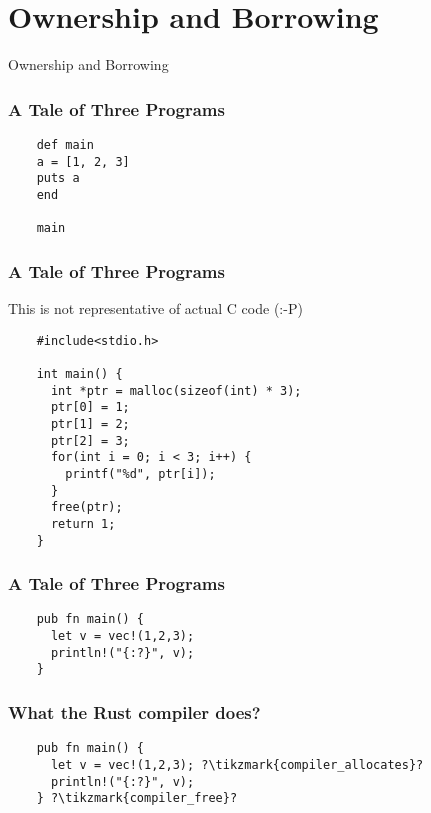 \section{Ownership and Borrowing}
\label{sec:ownership-borrowing}

\begin{frame}
  \centerline{
    \huge{Ownership and Borrowing}
  }
\end{frame}

\begin{frame}[fragile]
  \frametitle{A Tale of Three Programs}
  \begin{verbatim}
    def main
    a = [1, 2, 3]
    puts a
    end

    main
  \end{verbatim}
\end{frame}

\begin{frame}[fragile]
  \frametitle{A Tale of Three Programs}
  This is not representative of actual C code (:-P) \break{}
  \begin{verbatim}
    #include<stdio.h>

    int main() {
      int *ptr = malloc(sizeof(int) * 3);
      ptr[0] = 1;
      ptr[1] = 2;
      ptr[2] = 3;
      for(int i = 0; i < 3; i++) {
        printf("%d", ptr[i]);
      }
      free(ptr);
      return 1;
    }
  \end{verbatim}
\end{frame}

\begin{frame}[fragile]
  \frametitle{A Tale of Three Programs}
  \begin{verbatim}
    pub fn main() {
      let v = vec!(1,2,3);
      println!("{:?}", v);
    }
  \end{verbatim}
\end{frame}

\begin{frame}[fragile]
  \frametitle{What the Rust compiler does?}
  \begin{verbatim}
    pub fn main() {
      let v = vec!(1,2,3); ?\tikzmark{compiler_allocates}?
      println!("{:?}", v);
    } ?\tikzmark{compiler_free}?
  \end{verbatim}
\end{frame}

